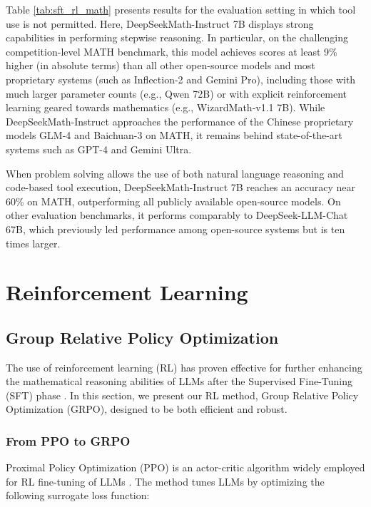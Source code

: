 Table \ref{tab:sft_rl_math} presents results for the evaluation setting in which tool use is not permitted. Here, DeepSeekMath-Instruct 7B displays strong capabilities in performing stepwise reasoning. In particular, on the challenging competition-level MATH benchmark, this model achieves scores at least 9\% higher (in absolute terms) than all other open-source models and most proprietary systems (such as Inflection-2 and Gemini Pro), including those with much larger parameter counts (e.g., Qwen 72B) or with explicit reinforcement learning geared towards mathematics (e.g., WizardMath-v1.1 7B). While DeepSeekMath-Instruct approaches the performance of the Chinese proprietary models GLM-4 and Baichuan-3 on MATH, it remains behind state-of-the-art systems such as GPT-4 and Gemini Ultra.

When problem solving allows the use of both natural language reasoning and code-based tool execution, DeepSeekMath-Instruct 7B reaches an accuracy near 60\% on MATH, outperforming all publicly available open-source models. On other evaluation benchmarks, it performs comparably to DeepSeek-LLM-Chat 67B, which previously led performance among open-source systems but is ten times larger.

\section{Reinforcement Learning}

\subsection{Group Relative Policy Optimization}
The use of reinforcement learning (RL) has proven effective for further enhancing the mathematical reasoning abilities of LLMs after the Supervised Fine-Tuning (SFT) phase \citep{wang2023math,wizardmath}. In this section, we present our RL method, Group Relative Policy Optimization (GRPO), designed to be both efficient and robust.

\subsubsection{From PPO to GRPO}
Proximal Policy Optimization (PPO) \citep{schulman2017proximal} is an actor-critic algorithm widely employed for RL fine-tuning of LLMs \citep{ouyang2022training}. The method tunes LLMs by optimizing the following surrogate loss function:

